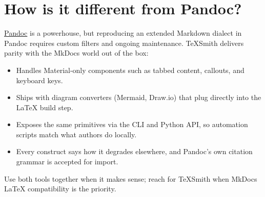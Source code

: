 \documentclass[a4paper,twoside]{article}
\begin{document}
\section{How is it different from Pandoc?}
\href{https://pandoc.org/}{Pandoc} is a powerhouse, but reproducing an extended
Markdown dialect in Pandoc requires custom filters and ongoing maintenance.
TeXSmith delivers parity with the MkDocs world out of the box:
\begin{itemize}
\item Handles Material-only components such as tabbed content, callouts, and
keyboard keys.
\item Ships with diagram converters (Mermaid, Draw.io) that plug directly
into the \LaTeX{} build step.
\item Exposes the same primitives via the CLI and Python API, so automation scripts
match what authors do locally.
\item Every construct says how it degrades elsewhere, and Pandoc's own citation
grammar is accepted for import.
\end{itemize}
Use both tools together when it makes sense; reach for TeXSmith when MkDocs \LaTeX{}
compatibility is the priority.
\end{document}
